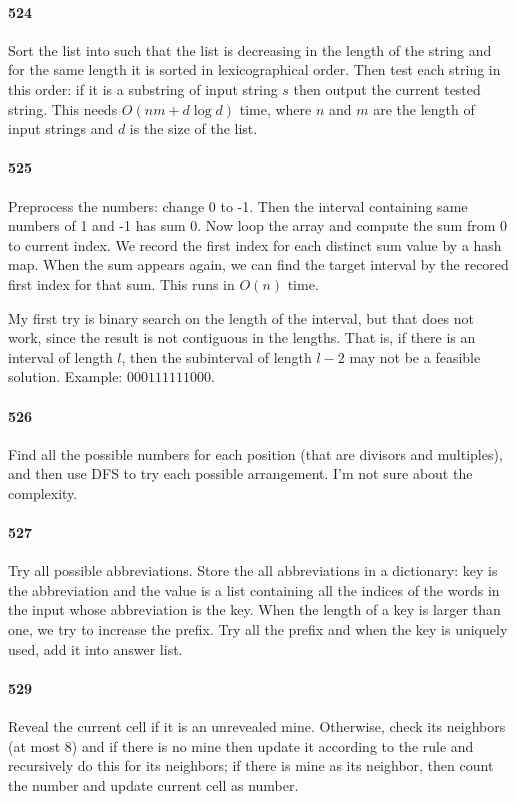 \documentclass[11pt]{article}
\begin{document}
\paragraph{524}
Sort the list into such that the list is decreasing in the length of the string and for the same length it is sorted in lexicographical order.
Then test each string in this order: if it is a substring of input string $s$ then output the current tested string.
This needs $O(nm + d \log d)$ time, where $n$ and $m$ are the length of input strings and $d$ is the size of the list.

\paragraph{525}
Preprocess the numbers: change 0 to -1.
Then the interval containing same numbers of 1 and -1 has sum 0.
Now loop the array and compute the sum from 0 to current index. 
We record the first index for each distinct sum value by a hash map.
When the sum appears again, we can find the target interval by the recored first index for that sum.
This runs in $O(n)$ time.

My first try is binary search on the length of the interval, but that does not work, since the result is not contiguous in the lengths. That is, if there is an interval of length $l$, then the subinterval of length $l-2$ may not be a feasible solution. Example: $000111111000$.


\paragraph{526}
Find all the possible numbers for each position (that are divisors and multiples), and then use DFS to try each possible arrangement.
I'm not sure about the complexity. 

\paragraph{527}
Try all possible abbreviations. Store the all abbreviations in a dictionary: key is the abbreviation and the value is a list
containing all the indices of the words in the input whose abbreviation is the key. When the length of a key is larger than 
one, we try to increase the prefix. Try all the prefix and when the key is uniquely used, add it into answer list.


\paragraph{529}
Reveal the current cell if it is an unrevealed mine.
Otherwise, check its neighbors (at most 8) and if there is no mine then update it according to the rule and recursively do this for its neighbors; if there is mine as its neighbor, then count the number and update current cell as number.
\end{document}
